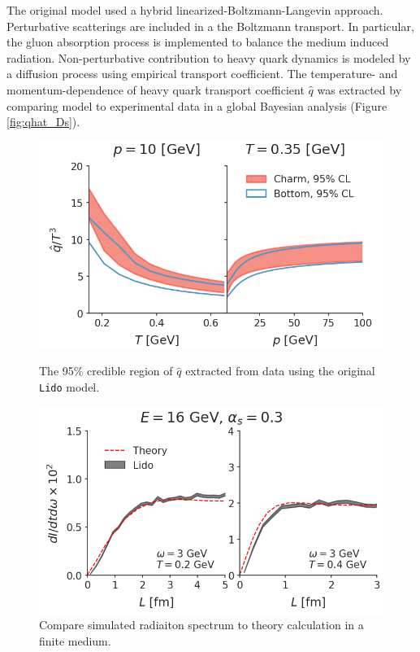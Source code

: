 \documentclass[12pt,a4paper]{revtex4-1}
\begin{document}
The original model used a hybrid linearized-Boltzmann-Langevin approach. Perturbative scatterings are included in a the Boltzmann transport. 
In particular, the gluon absorption process is implemented to balance the medium induced radiation. 
Non-perturbative contribution to heavy quark dynamics is modeled by a diffusion process using empirical transport coefficient.
The temperature- and momentum-dependence of heavy quark transport coefficient $\hat{q}$ was extracted by comparing model to experimental data in a global Bayesian analysis (Figure \ref{fig:qhat_Ds}).
\begin{figure}[ht]
\centering
\begin{minipage}{.48\textwidth}
  \centering
  \includegraphics[width=\textwidth]{qhat_p_T.png}
  \caption{The 95\% credible region of $\hat{q}$ extracted from data using the original {\tt Lido} model.}\label{fig:qhat_Ds}
\end{minipage}
\hfill
\begin{minipage}{.48\textwidth}
  \centering
  \includegraphics[width=\textwidth]{spectrum_L.png}
  \caption{Compare simulated radiaiton spectrum to theory calculation \cite{CaronHuot:2010bp} in a finite medium.}\label{fig:spectra}
\end{minipage}
\end{figure}
\end{document}
